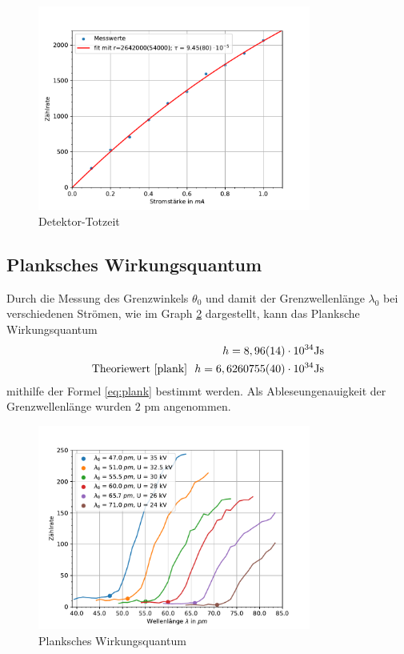 \documentclass[11pt, a4paper]{article}
\begin{document}
    \begin{figure}
        \centering
        \includegraphics[width=0.8\textwidth]{Detektortotzeit.pdf}
        \caption{Detektor-Totzeit}
        \label{fig:totzeit}
    \end{figure}

    \subsection{Planksches Wirkungsquantum}

    Durch die Messung des Grenzwinkels $\theta_0$ und damit der Grenzwellenlänge $\lambda_0$ bei verschiedenen Strömen, wie im Graph \ref{fig:plank} dargestellt, kann das Planksche Wirkungsquantum
    \begin{align}
        h = 8,96(14) \cdot 10^{34} \text{Js} \\
        \text{Theoriewert \cite{plank}} \ \  h = 6,6260755(40) \cdot 10^{34} \text{Js}
    \end{align}
    mithilfe der Formel \ref{eq:plank} bestimmt werden. Als Ableseungenauigkeit der Grenzwellenlänge wurden $2$ pm angenommen.

    \begin{figure}
        \centering
        \includegraphics[width=0.8\textwidth]{Plank.pdf}
        \caption{Planksches Wirkungsquantum}
        \label{fig:plank}
    \end{figure}
\end{document}

